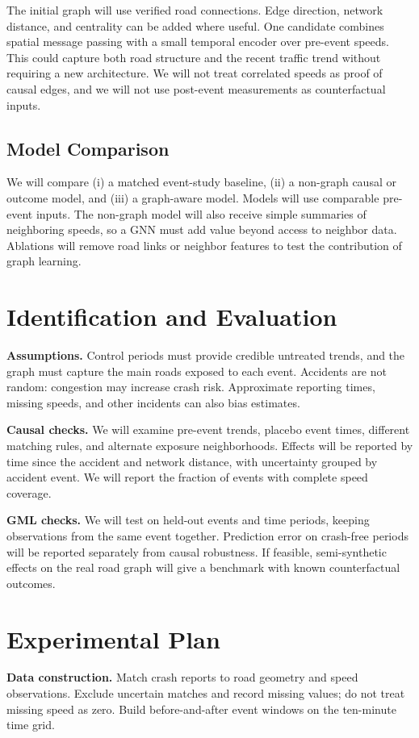 \documentclass[sigconf,nonacm]{acmart}
\begin{document}
The initial graph will use verified road connections. Edge direction,
network distance, and centrality can be added where useful. One
candidate combines spatial message passing with a small temporal
encoder over pre-event speeds. This could capture both road structure
and the recent traffic trend without requiring a new architecture.
We will not treat correlated speeds as proof of causal edges, and we
will not use post-event measurements as counterfactual inputs.

\subsection{Model Comparison}
We will compare (i) a matched event-study baseline, (ii) a non-graph
causal or outcome model, and (iii) a graph-aware model. Models will use comparable pre-event inputs. The non-graph model will
also receive simple summaries of neighboring speeds, so a GNN must
add value beyond access to neighbor data. Ablations will remove road
links or neighbor features to test the contribution of graph learning.

\section{Identification and Evaluation}
\textbf{Assumptions.} Control periods must provide credible untreated
trends, and the graph must capture the main roads exposed to each
event. Accidents are not random: congestion may increase crash risk.
Approximate reporting times, missing speeds, and other incidents can
also bias estimates.

\textbf{Causal checks.} We will examine pre-event trends, placebo
event times, different matching rules, and alternate exposure
neighborhoods. Effects will be reported by time since the accident
and network distance, with uncertainty grouped by accident event.
We will report the fraction of events with complete speed coverage.

\textbf{GML checks.} We will test on held-out events and time periods,
keeping observations from the same event together. Prediction error
on crash-free periods will be reported separately from causal
robustness. If feasible, semi-synthetic effects on the real road graph
will give a benchmark with known counterfactual outcomes.

\section{Experimental Plan}
\textbf{Data construction.} Match crash reports to road geometry and
speed observations. Exclude uncertain matches and record missing
values; do not treat missing speed as zero. Build before-and-after
event windows on the ten-minute time grid.
\end{document}

